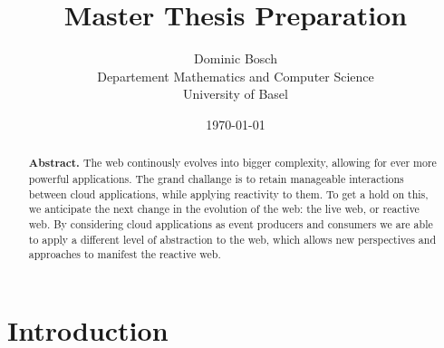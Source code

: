 \documentclass[11pt]{article}%
\begin{document}
\title{Master Thesis Preparation}
\date{\today}
\author{Dominic Bosch \\ Departement Mathematics and Computer Science \\ University of Basel}

\maketitle

\renewcommand{\abstractname}{}
\begin{abstract}
\textbf{Abstract.}
The web continously evolves into bigger complexity, allowing for ever more powerful applications. The grand challange is to retain manageable interactions between cloud applications, while applying reactivity to them. To get a hold on this, we anticipate the next change in the evolution of the web: the live web, or reactive web. By considering cloud applications as event producers and consumers we are able to apply a different level of abstraction to the web, which allows new perspectives and approaches to manifest the reactive web.
\end{abstract}


\section{Introduction}
\end{document}
